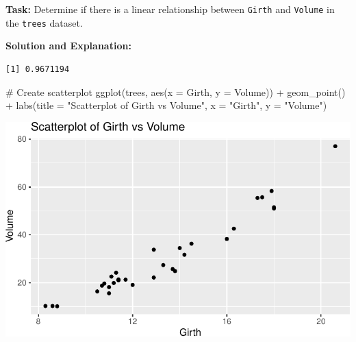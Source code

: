 \documentclass[
  letterpaper,
  DIV=11,
  numbers=noendperiod]{scrreprt}
\newenvironment{Shaded}{\begin{snugshade}}{\end{snugshade}}
\newcommand{\AttributeTok}[1]{\textcolor[rgb]{0.40,0.45,0.13}{#1}}
\newcommand{\CommentTok}[1]{\textcolor[rgb]{0.37,0.37,0.37}{#1}}
\newcommand{\FunctionTok}[1]{\textcolor[rgb]{0.28,0.35,0.67}{#1}}
\newcommand{\NormalTok}[1]{\textcolor[rgb]{0.00,0.23,0.31}{#1}}
\newcommand{\OtherTok}[1]{\textcolor[rgb]{0.00,0.23,0.31}{#1}}
\newcommand{\SpecialCharTok}[1]{\textcolor[rgb]{0.37,0.37,0.37}{#1}}
\newcommand{\StringTok}[1]{\textcolor[rgb]{0.13,0.47,0.30}{#1}}
\begin{document}
\textbf{Task:} Determine if there is a linear relationship between
\texttt{Girth} and \texttt{Volume} in the \texttt{trees} dataset.

\textbf{Solution and Explanation:}

\begin{Shaded}
\end{Shaded}

\begin{verbatim}
[1] 0.9671194
\end{verbatim}

\begin{Shaded}
\begin{Highlighting}[]
\CommentTok{\# Create scatterplot}
\FunctionTok{ggplot}\NormalTok{(trees, }\FunctionTok{aes}\NormalTok{(}\AttributeTok{x =}\NormalTok{ Girth, }\AttributeTok{y =}\NormalTok{ Volume)) }\SpecialCharTok{+}
  \FunctionTok{geom\_point}\NormalTok{() }\SpecialCharTok{+}
  \FunctionTok{labs}\NormalTok{(}\AttributeTok{title =} \StringTok{"Scatterplot of Girth vs Volume"}\NormalTok{, }\AttributeTok{x =} \StringTok{"Girth"}\NormalTok{, }\AttributeTok{y =} \StringTok{"Volume"}\NormalTok{)}
\end{Highlighting}
\end{Shaded}

\includegraphics{Scatterplots_and_Correlation_files/figure-pdf/unnamed-chunk-13-1.pdf}
\end{document}
